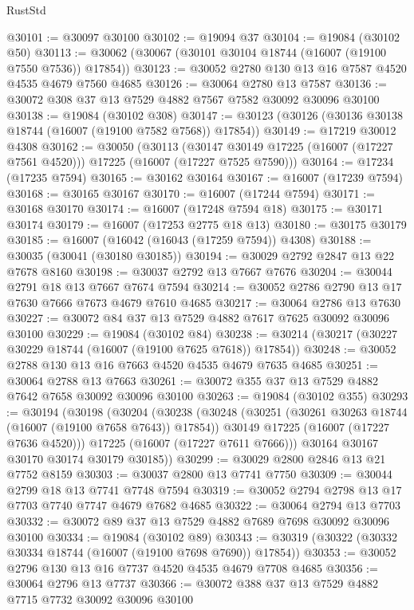 \begin{lexlean}{RustStd}
\begin{coremodule}
@30101 := @30097 @30100
@30102 := @19094 @37
@30104 := @19084 (@30102 @50)
@30113 := @30062 (@30067 (@30101 @30104 @18744 (@16007 (@19100 @7550 @7536)) @17854))
@30123 := @30052 @2780 @130 @13 @16 @7587 @4520 @4535 @4679 @7560 @4685
@30126 := @30064 @2780 @13 @7587
@30136 := @30072 @308 @37 @13 @7529 @4882 @7567 @7582 @30092 @30096 @30100
@30138 := @19084 (@30102 @308)
@30147 := @30123 (@30126 (@30136 @30138 @18744 (@16007 (@19100 @7582 @7568)) @17854))
@30149 := @17219 @30012 @4308
@30162 := @30050
    (@30113
      (@30147 @30149 @17225 (@16007 (@17227 @7561 @4520)))
      @17225
      (@16007 (@17227 @7525 @7590)))
@30164 := @17234 (@17235 @7594)
@30165 := @30162 @30164
@30167 := @16007 (@17239 @7594)
@30168 := @30165 @30167
@30170 := @16007 (@17244 @7594)
@30171 := @30168 @30170
@30174 := @16007 (@17248 @7594 @18)
@30175 := @30171 @30174
@30179 := @16007 (@17253 @2775 @18 @13)
@30180 := @30175 @30179
@30185 := @16007 (@16042 (@16043 (@17259 @7594)) @4308)
@30188 := @30035 (@30041 (@30180 @30185))
@30194 := @30029 @2792 @2847 @13 @22 @7678 @8160
@30198 := @30037 @2792 @13 @7667 @7676
@30204 := @30044 @2791 @18 @13 @7667 @7674 @7594
@30214 := @30052 @2786 @2790 @13 @17 @7630 @7666 @7673 @4679 @7610 @4685
@30217 := @30064 @2786 @13 @7630
@30227 := @30072 @84 @37 @13 @7529 @4882 @7617 @7625 @30092 @30096 @30100
@30229 := @19084 (@30102 @84)
@30238 := @30214 (@30217 (@30227 @30229 @18744 (@16007 (@19100 @7625 @7618)) @17854))
@30248 := @30052 @2788 @130 @13 @16 @7663 @4520 @4535 @4679 @7635 @4685
@30251 := @30064 @2788 @13 @7663
@30261 := @30072 @355 @37 @13 @7529 @4882 @7642 @7658 @30092 @30096 @30100
@30263 := @19084 (@30102 @355)
@30293 := @30194
    (@30198
      (@30204
        (@30238
          (@30248
            (@30251 (@30261 @30263 @18744 (@16007 (@19100 @7658 @7643)) @17854))
            @30149
            @17225
            (@16007 (@17227 @7636 @4520)))
          @17225
          (@16007 (@17227 @7611 @7666)))
        @30164
        @30167
        @30170
        @30174
        @30179
        @30185))
@30299 := @30029 @2800 @2846 @13 @21 @7752 @8159
@30303 := @30037 @2800 @13 @7741 @7750
@30309 := @30044 @2799 @18 @13 @7741 @7748 @7594
@30319 := @30052 @2794 @2798 @13 @17 @7703 @7740 @7747 @4679 @7682 @4685
@30322 := @30064 @2794 @13 @7703
@30332 := @30072 @89 @37 @13 @7529 @4882 @7689 @7698 @30092 @30096 @30100
@30334 := @19084 (@30102 @89)
@30343 := @30319 (@30322 (@30332 @30334 @18744 (@16007 (@19100 @7698 @7690)) @17854))
@30353 := @30052 @2796 @130 @13 @16 @7737 @4520 @4535 @4679 @7708 @4685
@30356 := @30064 @2796 @13 @7737
@30366 := @30072 @388 @37 @13 @7529 @4882 @7715 @7732 @30092 @30096 @30100

\end{coremodule}
\end{lexlean}
